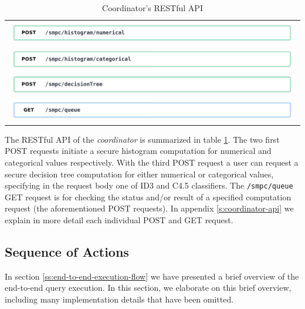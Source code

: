 \begin{table}[H]
  \centering
  \caption{Coordinator's RESTful API}
  \label{t:coordinator-api}
\begin{tabular}{l}
  \hyperref[s:post1]{\includegraphics[page=1,width=\textwidth]{figures/post1.pdf}} \\
  \hyperref[s:post2]{\includegraphics[page=1,width=\textwidth]{figures/post2.pdf}} \\
  \hyperref[s:post3]{\includegraphics[page=1,width=\textwidth]{figures/post3.pdf}} \\
  \hyperref[s:get1]{\includegraphics[page=1,width=\textwidth]{figures/get1.pdf}} \\
\end{tabular}
\end{table}


The RESTful API of the \textit{coordinator} is summarized in table \ref{t:coordinator-api}.
The two first POST requests initiate a secure histogram computation for numerical and categorical values respectively.
With the third POST request a user can request a secure decision tree computation for either numerical or categorical values, specifying in the request body one of ID3 and C4.5 classifiers.
The \texttt{/smpc/queue} GET request is for checking the status and/or result of a specified computation request (the aforementioned POST requests).
In appendix \ref{s:coordinator-api} we explain in more detail each individual POST and GET request.


\subsection{Sequence of Actions}\label{ss:coordinator-sequence}

In section \ref{ss:end-to-end-execution-flow} we have presented a brief overview of the end\hyp to\hyp end query execution.
In this section, we elaborate on this brief overview, including many implementation details that have been omitted.


